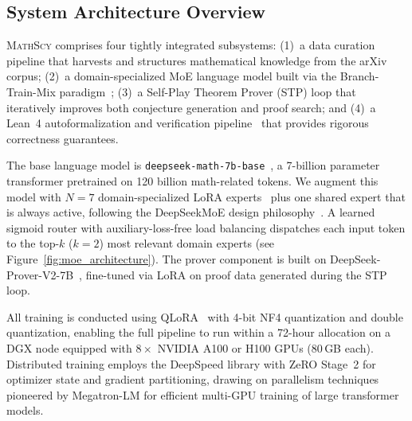 \documentclass[11pt,a4paper]{article}
\newcommand{\mathscy}{\textsc{MathScy}}
\begin{document}
\subsection{System Architecture Overview}
\label{sec:architecture}

\mathscy{} comprises four tightly integrated subsystems: (1)~a data curation pipeline that harvests and structures mathematical knowledge from the arXiv corpus; (2)~a domain-specialized MoE language model built via the Branch-Train-Mix paradigm~\citep{sukhbaatar2024branch}; (3)~a Self-Play Theorem Prover (STP) loop that iteratively improves both conjecture generation and proof search; and (4)~a Lean~4 autoformalization and verification pipeline~\citep{moura2021lean} that provides rigorous correctness guarantees.

The base language model is \texttt{deepseek-math-7b-base}~\citep{shao2024deepseekmath}, a 7-billion parameter transformer pretrained on 120 billion math-related tokens. We augment this model with $N{=}7$ domain-specialized LoRA experts~\citep{hu2022lora} plus one shared expert that is always active, following the DeepSeekMoE design philosophy~\citep{deepseekai2024deepseekv3}. A learned sigmoid router with auxiliary-loss-free load balancing dispatches each input token to the top-$k$ ($k{=}2$) most relevant domain experts (see Figure~\ref{fig:moe_architecture}). The prover component is built on DeepSeek-Prover-V2-7B~\citep{xin2024deepseekproverv2}, fine-tuned via LoRA on proof data generated during the STP loop.

All training is conducted using QLoRA~\citep{dettmers2023qlora} with 4-bit NF4 quantization and double quantization, enabling the full pipeline to run within a 72-hour allocation on a DGX node equipped with $8\times$ NVIDIA A100 or H100 GPUs (80\,GB each). Distributed training employs the DeepSpeed library \citep{rasley2020deepspeed} with ZeRO Stage~2 \citep{rajbhandari2020zero} for optimizer state and gradient partitioning, drawing on parallelism techniques pioneered by Megatron-LM \citep{shoeybi2020megatronlm} for efficient multi-GPU training of large transformer models.
\end{document}
